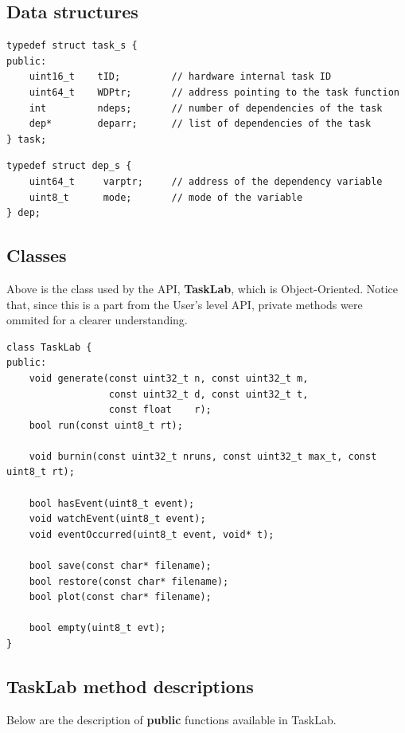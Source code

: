 \subsection{Data structures}
\begin{verbatim}
typedef struct task_s {
public:
    uint16_t    tID;         // hardware internal task ID
    uint64_t    WDPtr;       // address pointing to the task function
    int         ndeps;       // number of dependencies of the task
    dep*        deparr;      // list of dependencies of the task
} task;

\end{verbatim}

\begin{verbatim}
typedef struct dep_s {
    uint64_t     varptr;     // address of the dependency variable
    uint8_t      mode;       // mode of the variable 
} dep; 
\end{verbatim}

\subsection{Classes}
Above is the class used by the API, \textbf{TaskLab}, which is Object-Oriented. Notice that, since this is a part from the User's level API, private methods were ommited for a clearer understanding.

\begin{verbatim}
class TaskLab {
public:
    void generate(const uint32_t n, const uint32_t m,
                  const uint32_t d, const uint32_t t,
                  const float    r);
    bool run(const uint8_t rt);

    void burnin(const uint32_t nruns, const uint32_t max_t, const uint8_t rt);

    bool hasEvent(uint8_t event);
    void watchEvent(uint8_t event);
    void eventOccurred(uint8_t event, void* t);

    bool save(const char* filename);
    bool restore(const char* filename);
    bool plot(const char* filename);

    bool empty(uint8_t evt);
}
\end{verbatim}

\subsection{TaskLab method descriptions}
Below are the description of \textbf{public} functions available in TaskLab.

